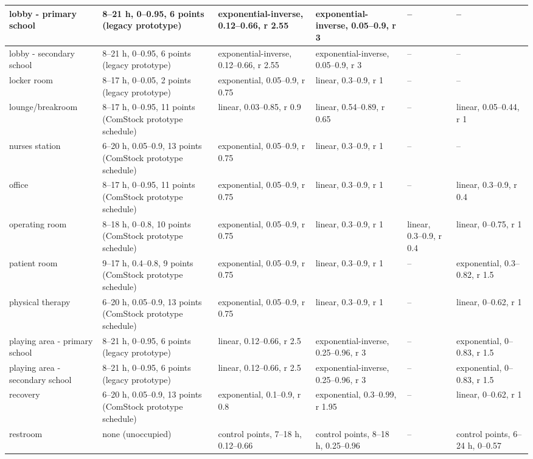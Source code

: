 \begin{center}
\begin{longtable}{|p{1.5in}|p{1.6in}|p{0.95in}|p{0.95in}|p{0.8in}|p{0.8in}|}
lobby - primary school & 8--21 h, 0--0.95, 6 points (legacy prototype) & exponential-inverse, 0.12--0.66, r 2.55 & exponential-inverse, 0.05--0.9, r 3 & -- & -- \\ \hline
lobby - secondary school & 8--21 h, 0--0.95, 6 points (legacy prototype) & exponential-inverse, 0.12--0.66, r 2.55 & exponential-inverse, 0.05--0.9, r 3 & -- & -- \\ \hline
locker room & 8--17 h, 0--0.05, 2 points (legacy prototype) & exponential, 0.05--0.9, r 0.75 & linear, 0.3--0.9, r 1 & -- & -- \\ \hline
lounge/breakroom & 8--17 h, 0--0.95, 11 points (ComStock prototype schedule) & linear, 0.03--0.85, r 0.9 & linear, 0.54--0.89, r 0.65 & -- & linear, 0.05--0.44, r 1 \\ \hline
nurses station & 6--20 h, 0.05--0.9, 13 points (ComStock prototype schedule) & exponential, 0.05--0.9, r 0.75 & linear, 0.3--0.9, r 1 & -- & -- \\ \hline
office & 8--17 h, 0--0.95, 11 points (ComStock prototype schedule) & exponential, 0.05--0.9, r 0.75 & linear, 0.3--0.9, r 1 & -- & linear, 0.3--0.9, r 0.4 \\ \hline
operating room & 8--18 h, 0--0.8, 10 points (ComStock prototype schedule) & exponential, 0.05--0.9, r 0.75 & linear, 0.3--0.9, r 1 & linear, 0.3--0.9, r 0.4 & linear, 0--0.75, r 1 \\ \hline
patient room & 9--17 h, 0.4--0.8, 9 points (ComStock prototype schedule) & exponential, 0.05--0.9, r 0.75 & linear, 0.3--0.9, r 1 & -- & exponential, 0.3--0.82, r 1.5 \\ \hline
physical therapy & 6--20 h, 0.05--0.9, 13 points (ComStock prototype schedule) & exponential, 0.05--0.9, r 0.75 & linear, 0.3--0.9, r 1 & -- & linear, 0--0.62, r 1 \\ \hline
playing area - primary school & 8--21 h, 0--0.95, 6 points (legacy prototype) & linear, 0.12--0.66, r 2.5 & exponential-inverse, 0.25--0.96, r 3 & -- & exponential, 0--0.83, r 1.5 \\ \hline
playing area - secondary school & 8--21 h, 0--0.95, 6 points (legacy prototype) & linear, 0.12--0.66, r 2.5 & exponential-inverse, 0.25--0.96, r 3 & -- & exponential, 0--0.83, r 1.5 \\ \hline
recovery & 6--20 h, 0.05--0.9, 13 points (ComStock prototype schedule) & exponential, 0.1--0.9, r 0.8 & exponential, 0.3--0.99, r 1.95 & -- & linear, 0--0.62, r 1 \\ \hline
restroom & none (unoccupied) & control points, 7--18 h, 0.12--0.66 & control points, 8--18 h, 0.25--0.96 & -- & control points, 6--24 h, 0--0.57 \\ \hline

\end{longtable}
\end{center}
